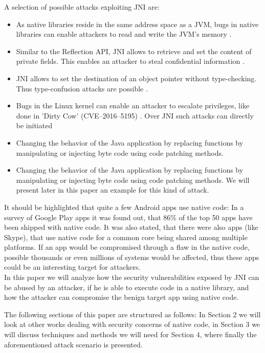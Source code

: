A selection of possible attacks exploiting JNI are:
\begin{itemize}
\item As native libraries reside in the same address space as a JVM, bugs in native
libraries can enable attackers to read and write the JVM's memory \cite[p. 3]{Sun_jvm-portablesandboxing}. %
	\item  Similar to the Reflection API, JNI allows to retrieve and set the content of private fields. This enables an attacker to steal confidential information \cite[p. 3]{Sun_jvm-portablesandboxing}.
	\item JNI allows to set the destination of an object pointer without type-checking. Thus type-confusion attacks are possible \cite[p. 4]{Sun_jvm-portablesandboxing}. %
	\item Bugs in the Linux kernel can enable an attacker to escalate privileges, like done in 'Dirty Cow' (CVE--2016--5195) \cite{DirtyCow}. Over JNI such attacks can directly be initiated
    \item Changing the behavior of the Java application by replacing functions by manipulating or injecting byte code using code patching methods.
	\item Changing the behavior of the Java application by replacing functions by manipulating or injecting byte code using code patching methods.
	We will present later in this paper an example for this kind of attack.
\end{itemize}

It should be highlighted that quite a few Android apps use native code: In a survey of Google Play apps \cite[p. 3]{Sun:2014:NPA:2627393.2627396} it was found out, that 86\% of the top 50 apps have been shipped with native code. It was also stated, that there were also apps (like Skype), that use native code for a common core being shared among multiple platforms. If an app would be compromised through a flaw in the native code, possible thousands or even millions of systems would be affected, thus these apps could be an interesting target for attackers. \\

In this paper we will analyze how the security vulnerabilities exposed by JNI can be abused by an attacker, if he is able to execute code in a native library, and how the attacker can compromise the benign target app using native code.

The following sections of this paper are structured as follows: In Section 2 we will look at other works dealing with security concerns of native code, in Section 3 we will discuss techniques and methods we will need for Section 4, where finally the aforementioned attack scenario is presented. 

